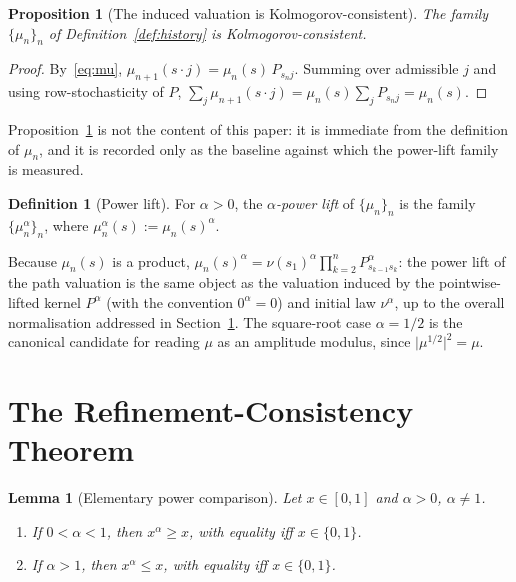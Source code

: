 \documentclass[11pt,a4paper]{article}
\newtheorem{proposition}[theorem]{Proposition}
\newtheorem{lemma}[theorem]{Lemma}
\theoremstyle{definition}
\newtheorem{definition}[theorem]{Definition}
\theoremstyle{remark}
\begin{document}
\begin{proposition}[The induced valuation is Kolmogorov-consistent]
  \label{prop:mu-consistent}
  The family $\{\mu_n\}_n$ of Definition~\ref{def:history} is Kolmogorov-consistent.
\end{proposition}

\begin{proof}
  By~\eqref{eq:mu}, $\mu_{n+1}(s \cdot j) = \mu_n(s)\, P_{s_n j}$. Summing over
  admissible $j$ and using row-stochasticity of $P$,
  $\sum_j \mu_{n+1}(s\cdot j) = \mu_n(s) \sum_j P_{s_n j} = \mu_n(s)$.
\end{proof}

Proposition~\ref{prop:mu-consistent} is not the content of this paper: it is immediate
from the definition of $\mu_n$, and it is recorded only as the baseline against which
the power-lift family is measured.

\begin{definition}[Power lift]
  \label{def:lift}
  For $\alpha > 0$, the \emph{$\alpha$-power lift} of $\{\mu_n\}_n$ is the family
  $\{\mu_n^\alpha\}_n$, where $\mu_n^\alpha(s) := \mu_n(s)^\alpha$.
\end{definition}

Because $\mu_n(s)$ is a product, $\mu_n(s)^\alpha = \nu(s_1)^\alpha
\prod_{k=2}^n P_{s_{k-1}s_k}^\alpha$: the power lift of the path valuation is the same
object as the valuation induced by the pointwise-lifted kernel $P^\alpha$ (with the
convention $0^\alpha=0$) and initial law $\nu^\alpha$, up to the overall normalisation
addressed in Section~\ref{sec:main}. The square-root case $\alpha=1/2$ is the
canonical candidate for reading $\mu$ as an amplitude modulus, since $\vert \mu^{1/2}
\vert^2 = \mu$.

\section{The Refinement-Consistency Theorem}
\label{sec:main}

\begin{lemma}[Elementary power comparison]
  \label{lem:power-compare}
  Let $x \in [0,1]$ and $\alpha>0$, $\alpha \ne 1$.
  \begin{enumerate}[label=(\roman*)]
    \item If $0<\alpha<1$, then $x^\alpha \ge x$, with equality iff $x \in \{0,1\}$.
    \item If $\alpha>1$, then $x^\alpha \le x$, with equality iff $x \in \{0,1\}$.
  \end{enumerate}
\end{lemma}
\end{document}
